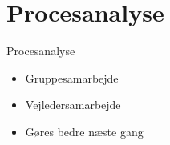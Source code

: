 \section{Procesanalyse}
\begin{frame}{Procesanalyse}{}
\begin{itemize}
\item Gruppesamarbejde
\item Vejledersamarbejde
\item Gøres bedre næste gang
\end{itemize}
\end{frame}